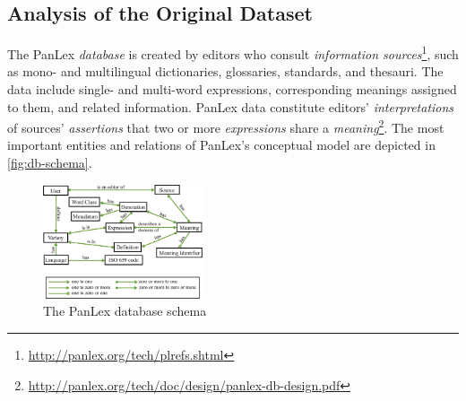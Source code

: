 \documentclass[sw]{iosart2c}
\begin{document}

\subsection{Analysis of the Original Dataset}
\label{sec:analysis}
The PanLex \emph{database} is created by editors who consult \emph{information sources}\footnote{\url{http://panlex.org/tech/plrefs.shtml}}, such as mono- and multilingual dictionaries, glossaries, standards, and thesauri. The data include single- and multi-word expressions, corresponding meanings assigned to them, and related information.
PanLex data constitute editors' \emph{interpretations} of sources' \emph{assertions} that two or more \emph{expressions} share a \emph{meaning}\footnote{\url{http://panlex.org/tech/doc/design/panlex-db-design.pdf}}.
The most important entities and relations of PanLex's conceptual model are depicted in \autoref{fig:db-schema}.

\begin{figure}
  \centering
  \includegraphics[width=0.42\textwidth]{images/pdf/db_schema.pdf}
  \caption{The PanLex database schema}
  \label{fig:db-schema}
\end{figure}
\end{document}
